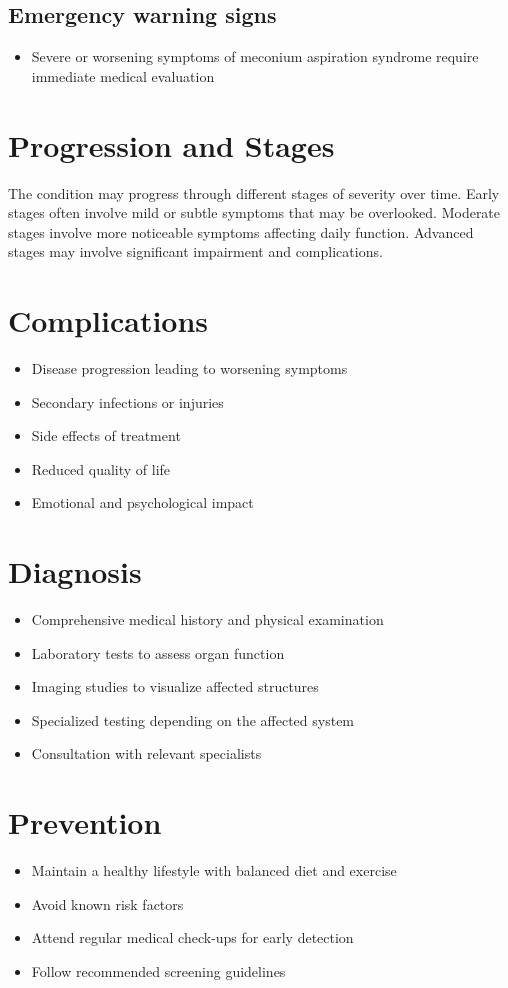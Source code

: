 \subsection{Emergency warning signs}
\begin{itemize}[noitemsep]
  \item Severe or worsening symptoms of meconium aspiration syndrome require immediate medical evaluation
\end{itemize}
\section{Progression and Stages}
The condition may progress through different stages of severity over time. Early stages often involve mild or subtle symptoms that may be overlooked. Moderate stages involve more noticeable symptoms affecting daily function. Advanced stages may involve significant impairment and complications.
\section{Complications}
\begin{itemize}[noitemsep]
  \item Disease progression leading to worsening symptoms
  \item Secondary infections or injuries
  \item Side effects of treatment
  \item Reduced quality of life
  \item Emotional and psychological impact
\end{itemize}
\section{Diagnosis}
\begin{itemize}[noitemsep]
  \item Comprehensive medical history and physical examination
  \item Laboratory tests to assess organ function
  \item Imaging studies to visualize affected structures
  \item Specialized testing depending on the affected system
  \item Consultation with relevant specialists
\end{itemize}
\section{Prevention}
\begin{itemize}[noitemsep]
  \item Maintain a healthy lifestyle with balanced diet and exercise
  \item Avoid known risk factors
  \item Attend regular medical check-ups for early detection
  \item Follow recommended screening guidelines
\end{itemize}
